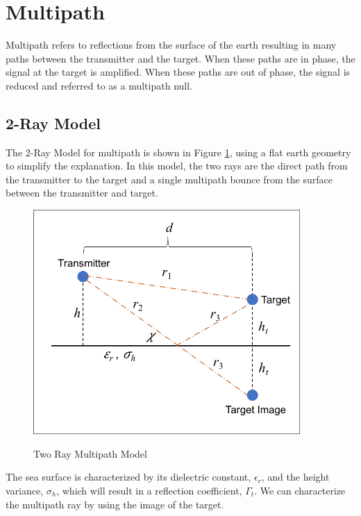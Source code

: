 \section{Multipath}
Multipath refers to reflections from the surface of the earth resulting in many paths between the transmitter and the target. When these paths are in phase, the signal at the target is amplified. When these paths are out of phase, the signal is reduced and referred to as a multipath null.

\subsection{2-Ray Model}
The 2-Ray Model for multipath is shown in Figure \ref{env_fig:3}, using a flat earth geometry to simplify the explanation. In this model, the two rays are the direct path from the transmitter to the target and a single multipath bounce from the surface between the transmitter and target.
\begin{figure}[H]
  \begin{center}
\includegraphics[width=4in]{../media/multistatic/two_ray_multipath_model.png}
  \end{center}
  \renewcommand{\baselinestretch}{1} \small\normalsize
  \begin{quote}
    \caption[Two Ray Multipath Model]{Two Ray Multipath Model\label{env_fig:3}}
  \end{quote}
\end{figure}
\renewcommand{\baselinestretch}{2} \small\normalsize
The sea surface is characterized by its dielectric constant, $\epsilon_r$, and the height variance, $\sigma_h$, which will result in a reflection coefficient, $\Gamma_t$. We can characterize the multipath ray by using the image of the target.


